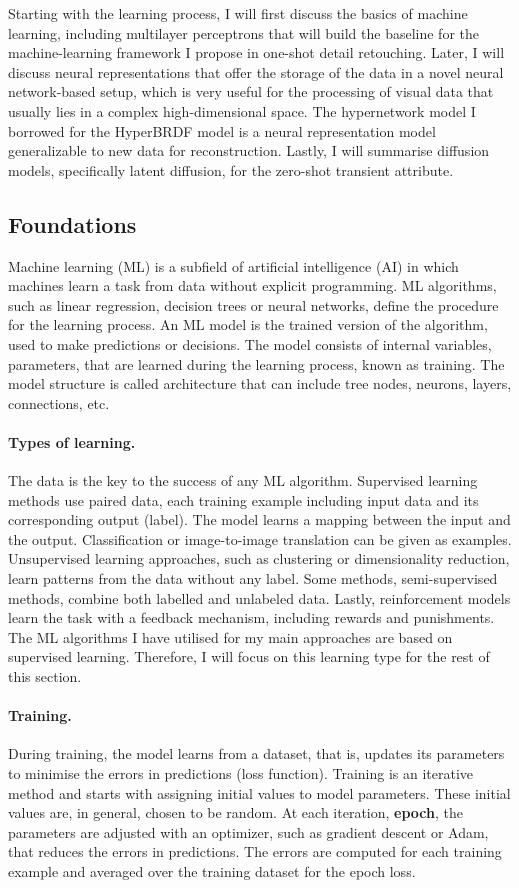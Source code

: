 Starting with the learning process, I will first discuss the basics of machine learning, including multilayer perceptrons that will build the baseline for the machine-learning framework I propose in one-shot detail retouching. Later, I will discuss neural representations that offer the storage of the data in a novel neural network-based setup, which is very useful for the processing of visual data that usually lies in a complex high-dimensional space. The hypernetwork model I borrowed for the HyperBRDF model is a neural representation model generalizable to new data for reconstruction. Lastly, I will summarise diffusion models, specifically latent diffusion, for the zero-shot transient attribute.

\subsection{Foundations}
Machine learning (ML) is a subfield of artificial intelligence (AI) in which machines learn a task from data without explicit programming. ML algorithms, such as linear regression, decision trees or neural networks, define the procedure for the learning process. An ML model is the trained version of the algorithm, used to make predictions or decisions. The model consists of internal variables, parameters, that are learned during the learning process, known as training. The model structure is called architecture that can include tree nodes, neurons, layers, connections, etc.

\paragraph{Types of learning.} The data is the key to the success of any ML algorithm. Supervised learning methods use paired data, each training example including input data and its corresponding output (label). The model learns a mapping between the input and the output. Classification or image-to-image translation can be given as examples. Unsupervised learning approaches, such as clustering or dimensionality reduction, learn patterns from the data without any label. Some methods, semi-supervised methods, combine both labelled and unlabeled data. Lastly, reinforcement models learn the task with a feedback mechanism, including rewards and punishments. The ML algorithms I have utilised for my main approaches are based on supervised learning. Therefore, I will focus on this learning type for the rest of this section.

\paragraph{Training.} During training, the model learns from a dataset, that is, updates its parameters to minimise the errors in predictions (loss function). Training is an iterative method and starts with assigning initial values to model parameters. These initial values are, in general, chosen to be random. At each iteration, \textbf{epoch}, the parameters are adjusted with an optimizer, such as gradient descent or Adam, that reduces the errors in predictions. The errors are computed for each training example and averaged over the training dataset for the epoch loss. 

